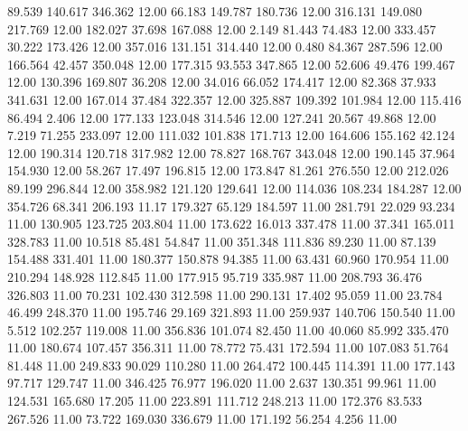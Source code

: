   89.539  140.617  346.362        12.00
  66.183  149.787  180.736        12.00
 316.131  149.080  217.769        12.00
 182.027   37.698  167.088        12.00
   2.149   81.443   74.483        12.00
 333.457   30.222  173.426        12.00
 357.016  131.151  314.440        12.00
   0.480   84.367  287.596        12.00
 166.564   42.457  350.048        12.00
 177.315   93.553  347.865        12.00
  52.606   49.476  199.467        12.00
 130.396  169.807   36.208        12.00
  34.016   66.052  174.417        12.00
  82.368   37.933  341.631        12.00
 167.014   37.484  322.357        12.00
 325.887  109.392  101.984        12.00
 115.416   86.494    2.406        12.00
 177.133  123.048  314.546        12.00
 127.241   20.567   49.868        12.00
   7.219   71.255  233.097        12.00
 111.032  101.838  171.713        12.00
 164.606  155.162   42.124        12.00
 190.314  120.718  317.982        12.00
  78.827  168.767  343.048        12.00
 190.145   37.964  154.930        12.00
  58.267   17.497  196.815        12.00
 173.847   81.261  276.550        12.00
 212.026   89.199  296.844        12.00
 358.982  121.120  129.641        12.00
 114.036  108.234  184.287        12.00
 354.726   68.341  206.193        11.17
 179.327   65.129  184.597        11.00
 281.791   22.029   93.234        11.00
 130.905  123.725  203.804        11.00
 173.622   16.013  337.478        11.00
  37.341  165.011  328.783        11.00
  10.518   85.481   54.847        11.00
 351.348  111.836   89.230        11.00
  87.139  154.488  331.401        11.00
 180.377  150.878   94.385        11.00
  63.431   60.960  170.954        11.00
 210.294  148.928  112.845        11.00
 177.915   95.719  335.987        11.00
 208.793   36.476  326.803        11.00
  70.231  102.430  312.598        11.00
 290.131   17.402   95.059        11.00
  23.784   46.499  248.370        11.00
 195.746   29.169  321.893        11.00
 259.937  140.706  150.540        11.00
   5.512  102.257  119.008        11.00
 356.836  101.074   82.450        11.00
  40.060   85.992  335.470        11.00
 180.674  107.457  356.311        11.00
  78.772   75.431  172.594        11.00
 107.083   51.764   81.448        11.00
 249.833   90.029  110.280        11.00
 264.472  100.445  114.391        11.00
 177.143   97.717  129.747        11.00
 346.425   76.977  196.020        11.00
   2.637  130.351   99.961        11.00
 124.531  165.680   17.205        11.00
 223.891  111.712  248.213        11.00
 172.376   83.533  267.526        11.00
  73.722  169.030  336.679        11.00
 171.192   56.254    4.256        11.00
